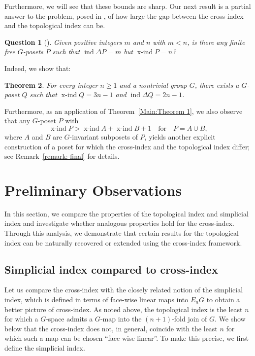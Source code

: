 \documentclass[preprint,12pt]{article}
\renewcommand{\ge}{\geqslant}
\newtheorem{theorem}{Theorem}[section]
\newtheorem{question}[theorem]{Question}
\theoremstyle{definition}
\theoremstyle{remark}
\numberwithin{equation}{section}
\DeclareMathOperator{\ind}{ind}
\DeclareMathOperator{\xind}{x-ind}
\begin{document}
Furthermore, we will see that these bounds are sharp. Our next result is a partial answer to the problem, posed in \cite{bui2023topological}, of how large the gap between the cross-index and the topological index can be. 

\begin{question}[{\cite[Question 1]{bui2023topological}}]
\label{que: que2}
Given positive integers $m$ and $n$ with $m< n$, is there any finite free $G$-posets $P$ such that
$\ind\Delta P  = m$ but $\xind P= n$? 
\end{question}

Indeed, we show that:
\begin{theorem}\label{thm:large-gap}
For every integer $n\ge 1$ and a nontrivial group $G$, there exists a $G$-poset $Q$ such that $\xind Q = 3n-1$ and $\ind\Delta Q= 2n-1$.
\end{theorem}
Furthermore, as an application of Theorem~\ref{Main:Theorem 1}, we also observe that any \(G\)-poset \(P\) with
\[
\xind P > \xind A + \xind B + 1 \quad \text{for} \quad P = A \cup B,
\]
where \(A\) and \(B\) are \(G\)-invariant subposets of \(P\), yields another explicit construction of a poset for which the cross-index and the topological index differ; see Remark~\ref{remark: final} for details.


\section{Preliminary Observations}

In this section, we compare the properties of the topological index and simplicial index and investigate whether analogous properties hold for the cross-index. Through this analysis, we demonstrate that certain results for the topological index can be naturally recovered or extended using the cross-index framework. 

\subsection{Simplicial index compared to cross-index}

Let us compare the cross-index with the closely related notion of the simplicial index, which is defined in terms of face-wise linear maps into \(E_n G\) to obtain a better picture of cross-index.  As noted above, the topological index is the least $n$ for which a $G$-space admits a $G$-map into the $(n+1)$-fold join of $G$. We show below that the cross-index does not, in general, coincide with the least $n$ for which such a map can be chosen ``face-wise linear''. To make this precise, we first define the simplicial index.
\end{document}
